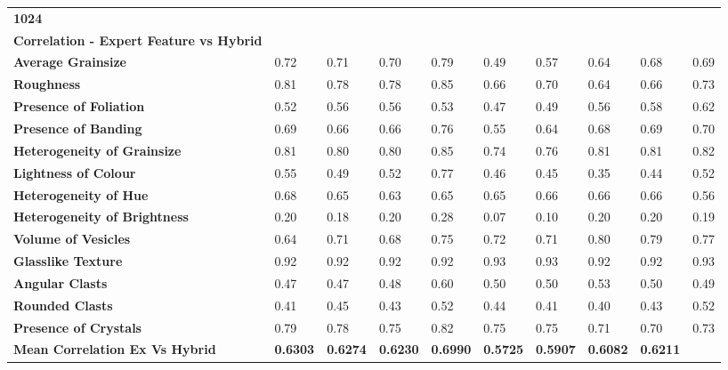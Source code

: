 \begin{longtable}[c]{@{}llllllllll@{}}
  \cellcolor[HTML]{FCE4D6}\textbf{1024} \\
\rowcolor[HTML]{F2F2F2} 
\textbf{Correlation - Expert Feature   vs Hybrid} &
  \textbf{} &
  \textbf{} &
  \textbf{} &
  \textbf{} &
  \textbf{} &
  \textbf{} &
  \textbf{} &
  \textbf{} &
  \textbf{} \\
\textbf{Average Grainsize} &
  0.72 &
  0.71 &
  0.70 &
  0.79 &
  0.49 &
  0.57 &
  0.64 &
  0.68 &
  0.69 \\
\textbf{Roughness} &
  0.81 &
  0.78 &
  0.78 &
  0.85 &
  0.66 &
  0.70 &
  0.64 &
  0.66 &
  0.73 \\
\textbf{Presence of Foliation} &
  0.52 &
  0.56 &
  0.56 &
  0.53 &
  0.47 &
  0.49 &
  0.56 &
  0.58 &
  0.62 \\
\textbf{Presence of Banding} &
  0.69 &
  0.66 &
  0.66 &
  0.76 &
  0.55 &
  0.64 &
  0.68 &
  0.69 &
  0.70 \\
\textbf{Heterogeneity of Grainsize} &
  0.81 &
  0.80 &
  0.80 &
  0.85 &
  0.74 &
  0.76 &
  0.81 &
  0.81 &
  0.82 \\
\textbf{Lightness of Colour} &
  0.55 &
  0.49 &
  0.52 &
  0.77 &
  0.46 &
  0.45 &
  0.35 &
  0.44 &
  0.52 \\
\textbf{Heterogeneity of Hue} &
  0.68 &
  0.65 &
  0.63 &
  0.65 &
  0.65 &
  0.66 &
  0.66 &
  0.66 &
  0.56 \\
\textbf{Heterogeneity of Brightness} &
  0.20 &
  0.18 &
  0.20 &
  0.28 &
  \cellcolor[HTML]{FFFF00}0.07 &
  \cellcolor[HTML]{FFFF00}0.10 &
  0.20 &
  0.20 &
  0.19 \\
\textbf{Volume of Vesicles} &
  0.64 &
  0.71 &
  0.68 &
  0.75 &
  0.72 &
  0.71 &
  0.80 &
  0.79 &
  0.77 \\
\textbf{Glasslike Texture} &
  0.92 &
  0.92 &
  0.92 &
  0.92 &
  0.93 &
  0.93 &
  0.92 &
  0.92 &
  0.93 \\
\textbf{Angular Clasts} &
  0.47 &
  0.47 &
  0.48 &
  0.60 &
  0.50 &
  0.50 &
  0.53 &
  0.50 &
  0.49 \\
\textbf{Rounded Clasts} &
  0.41 &
  0.45 &
  0.43 &
  0.52 &
  0.44 &
  0.41 &
  0.40 &
  0.43 &
  0.52 \\
\textbf{Presence of Crystals} &
  0.79 &
  0.78 &
  0.75 &
  0.82 &
  0.75 &
  0.75 &
  0.71 &
  0.70 &
  0.73 \\
\cellcolor[HTML]{FFFF00}\textbf{Mean Correlation Ex Vs Hybrid} &
  \textbf{0.6303} &
  \textbf{0.6274} &
  \textbf{0.6230} &
  \cellcolor[HTML]{FFFF00}\textbf{0.6990} &
  \textbf{0.5725} &
  \textbf{0.5907} &
  \textbf{0.6082} &
  \textbf{0.6211} &

\end{longtable}
